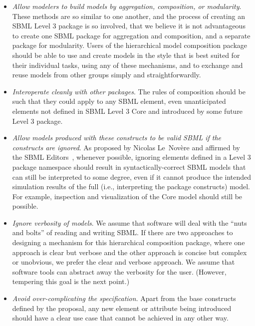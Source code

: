 \begin{itemize}

\item \emph{Allow modelers to build models by aggregation, composition,
    or modularity}.  These methods are so similar to one another, and the
  process of creating an SBML Level 3 package is so involved, that we
  believe it is not advantageous to create one SBML package for
  aggregation and composition, and a separate package for modularity.
  Users of the hierarchical model composition package should be able to
  use and create models in the style that is best suited for their
  individual tasks, using any of these mechanisms, and to exchange and
  reuse models from other groups simply and straightforwardly.

\item \emph{Interoperate cleanly with other packages}. The rules of
  composition should be such that they could apply to any SBML element,
  even unanticipated elements not defined in SBML Level 3 Core and
  introduced by some future Level 3 package.

\item \emph{Allow models produced with these constructs to be valid SBML
    if the constructs are ignored}.  As proposed by Nicolas
  Le~Nov\`{e}re and affirmed by the SBML Editors~\cite{}, whenever
  possible, ignoring elements defined in a Level 3 package namespace
  should result in syntactically-correct SBML models that can still be
  interpreted to some degree, even if it cannot produce the intended
  simulation results of the full (i.e., interpreting the package
  constructs) model.  For example, inspection and visualization of the
  Core model should still be possible.

\item \emph{Ignore verbosity of models}. We assume that software will
  deal with the ``nuts and bolts'' of reading and writing SBML.  If
  there are two approaches to designing a mechanism for this
  hierarchical composition package, where one approach is clear but
  verbose and the other approach is concise but complex or unobvious, we
  prefer the clear and verbose approach.  We assume that software tools
  can abstract away the verbosity for the user.  (However, tempering
  this goal is the next point.)

\item \emph{Avoid over-complicating the specification}. Apart from the
  base constructs defined by the proposal, any new element or attribute
  being introduced should have a clear use case that cannot be achieved
  in any other way.  


\end{itemize}
